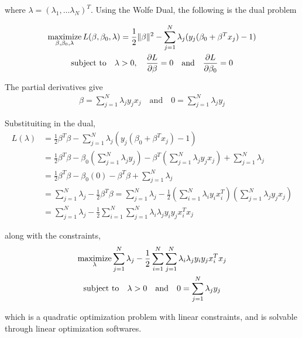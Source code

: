 \documentclass[../statistical_learning_notes.tex]{subfiles}
\begin{document}
    where $\lambda = (\lambda_{1}, \ldots \lambda_{N})^{T}$. Using the Wolfe Dual, the following is the dual problem

    \begin{gather*}
        \operatorname*{maximize}_{\beta, \beta_{0}, \lambda} L(\beta, \beta_{0}, \lambda) = \frac{1}{2}\lVert \beta \rVert^{2} - \sum_{j=1}^{N} \lambda_{j} (y_{j}(\beta_{0} + \beta^{T}x_{j}) - 1)\\
        \text{subject to} \quad \lambda > 0, \quad \frac{\partial L}{\partial \beta} = 0 \quad \text{and} \quad \frac{\partial L}{\partial \beta_{0}} = 0
    \end{gather*}

    The partial derivatives give
    \begin{align*}
        \beta = \sum_{j=1}^{N} \lambda_{j} y_{j}x_{j} \quad \text{and} \quad 0 = \sum_{j=1}^{N}\lambda_{j} y_{j}
    \end{align*}

    Substituiting in the dual,
    \begin{align*}
        L(\lambda) &= \frac{1}{2}\beta^{T} \beta - \sum_{j=1}^{N} \lambda_{j} (y_{j}(\beta_{0} + \beta^{T}x_{j}) - 1)\\
        &= \frac{1}{2}\beta^{T} \beta - \beta_{0}(\sum_{j=1}^{N} \lambda_{j} y_{j}) - \beta^{T}(\sum_{j=1}^{N} \lambda_{j} y_{j} x_{j}) + \sum_{j=1}^{N}\lambda_{j}\\
        &= \frac{1}{2}\beta^{T} \beta - \beta_{0}(0) - \beta^{T} \beta + \sum_{j=1}^{N}\lambda_{j}\\
        &= \sum_{j=1}^{N}\lambda_{j} - \frac{1}{2}\beta^{T} \beta
        = \sum_{j=1}^{N}\lambda_{j} - \frac{1}{2}(\sum_{i=1}^{N} \lambda_{i} y_{i}x_{i}^{T})(\sum_{j=1}^{N} \lambda_{j} y_{j}x_{j})\\
        &= \sum_{j=1}^{N}\lambda_{j} - \frac{1}{2} \sum_{i=1}^{N} \sum_{j=1}^{N} \lambda_{i} \lambda_{j} y_{i}y_{j}x_{i}^{T}x_{j}
    \end{align*}

    along with the constraints,
    \begin{gather*}
        \operatorname*{maximize}_{\lambda} \sum_{j=1}^{N}\lambda_{j} - \frac{1}{2} \sum_{i=1}^{N} \sum_{j=1}^{N} \lambda_{i} \lambda_{j} y_{i}y_{j}x_{i}^{T}x_{j}\\
        \text{subject to} \quad \lambda > 0 \quad \text{and} \quad 0 = \sum_{j=1}^{N}\lambda_{j} y_{j}
    \end{gather*}

    which is a quadratic optimization problem with linear constraints, and is solvable through linear optimization softwares.\newline
\end{document}
